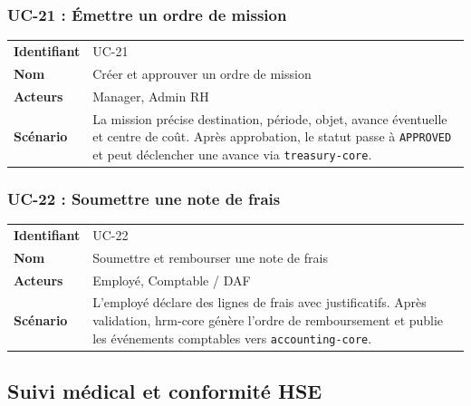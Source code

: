 \documentclass[a4paper,12pt,openany]{book}
\begin{document}
    \subsubsection*{UC-21 : Émettre un ordre de mission}
    \begin{table}[H]
        \centering
        \begin{tabularx}{\textwidth}{lX}
    \toprule
    \textbf{Identifiant} & UC-21 \\
    \textbf{Nom}         & Créer et approuver un ordre de mission \\
    \textbf{Acteurs}     & Manager, Admin RH \\
    \midrule
    \textbf{Scénario} & La mission précise destination, période, objet, avance éventuelle et centre de coût. Après approbation, le statut passe à \texttt{APPROVED} et peut déclencher une avance via \texttt{treasury-core}. \\
    \bottomrule
        \end{tabularx}
    \end{table}

    \subsubsection*{UC-22 : Soumettre une note de frais}
    \begin{table}[H]
        \centering
        \begin{tabularx}{\textwidth}{lX}
    \toprule
    \textbf{Identifiant} & UC-22 \\
    \textbf{Nom}         & Soumettre et rembourser une note de frais \\
    \textbf{Acteurs}     & Employé, Comptable / DAF \\
    \midrule
    \textbf{Scénario} & L'employé déclare des lignes de frais avec justificatifs. Après validation, hrm-core génère l'ordre de remboursement et publie les événements comptables vers \texttt{accounting-core}. \\
    \bottomrule
        \end{tabularx}
    \end{table}


    \subsection{Suivi médical et conformité HSE}
\end{document}
